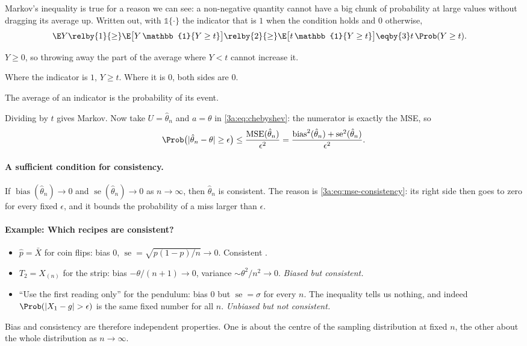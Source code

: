 Markov's inequality is true for a reason we can see: a non-negative
quantity cannot have a big chunk of probability at large values without
dragging its average up. Written out, with $\mathbb{1}\{\cdot\}$ the
indicator that is $1$ when the condition holds and $0$ otherwise,
\begin{align}
  \E Y
  &\relby{1}{\ge} \E\bigl[Y\,\mathbb{1}\{Y\ge t\}\bigr]
   \relby{2}{\ge} \E\bigl[t\,\mathbb{1}\{Y\ge t\}\bigr]
   \eqby{3} t\,\Prob(Y\ge t).
  \label{3a:eq:markov}
\end{align}
\begin{explain}
  \item $Y\ge0$, so throwing away the part of the average where $Y<t$ cannot increase it.
  \item Where the indicator is $1$, $Y\ge t$. Where it is $0$, both sides are $0$.
  \item The average of an indicator is the probability of its event.
\end{explain}
Dividing by $t$ gives Markov. Now take $U=\hat\theta_n$ and $a=\theta$ in
\eqref{3a:eq:chebyshev}: the numerator is exactly the MSE, so
\begin{equation}
  \Prob\bigl(|\hat\theta_n-\theta|\ge\epsilon\bigr)
  \le\frac{\operatorname{MSE}(\hat\theta_n)}{\epsilon^2}
  =\frac{\operatorname{bias}^2(\hat\theta_n)+\operatorname{se}^2(\hat\theta_n)}{\epsilon^2}.
  \label{3a:eq:mse-consistency}
\end{equation}

\paragraph{A sufficient condition for consistency.}
If $\operatorname{bias}(\hat\theta_n)\to0$ and
$\operatorname{se}(\hat\theta_n)\to0$ as $n\to\infty$, then $\hat\theta_n$ is
consistent. The reason is \eqref{3a:eq:mse-consistency}: its right side then
goes to zero for every fixed $\epsilon$, and it bounds the probability of a
miss larger than $\epsilon$.

\paragraph{Example: Which recipes are consistent?}
\label{3a:ex:consistency}
\begin{itemize}
  \item $\hat p=\bar X$ for coin flips: bias $0$, $\operatorname{se}=\sqrt{p(1-p)/n}\to0$.
        Consistent .
  \item $T_2=X_{(n)}$ for the strip: bias $-\theta/(n+1)\to0$, variance
        $\sim\theta^2/n^2\to0$. \emph{Biased but consistent.}
  \item ``Use the first reading only'' for the pendulum: bias $0$ but
        $\operatorname{se}=\sigma$ for every $n$. The inequality tells us
        nothing, and indeed $\Prob(|X_1-g|>\epsilon)$ is the same fixed
        number for all $n$. \emph{Unbiased but not consistent.}
\end{itemize}
Bias and consistency are therefore independent properties. One is about
the centre of the sampling distribution at fixed $n$, the other about the
whole distribution as $n\to\infty$.

